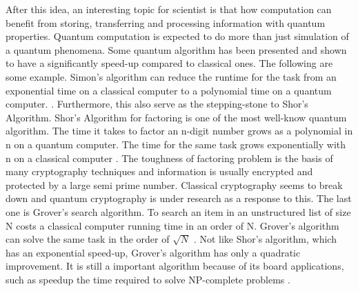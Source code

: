 \documentclass[twoside,a4paper,article]{combine}
\begin{document}
After this idea, an interesting topic for scientist is that how computation can benefit from storing, transferring and processing information with quantum properties. Quantum computation is expected to do more than just simulation of a quantum phenomena. Some quantum algorithm has been presented and shown to have a significantly speed-up compared to classical ones. The following are some example. Simon's algorithm can reduce the runtime for the task from an exponential time on a classical computer to a polynomial time on a quantum computer. \cite{Simon1994}. Furthermore, this also serve as the stepping-stone to Shor's Algorithm. Shor's Algorithm for factoring is one of the most well-know quantum algorithm. The time it takes to factor an n-digit number grows as a polynomial in n on a quantum computer. The time for the same task grows exponentially with n on a classical computer \cite{Shor1995}. The toughness of factoring problem is the basis of many cryptography techniques and information is usually encrypted and protected by a large semi prime number. Classical cryptography seems to break down and  quantum cryptography is under research as a response to this. The last one is Grover's search algorithm. To search an item in an unstructured list of size N costs a classical computer running time in an order of N. Grover's algorithm can solve the same task in the order of $\sqrt{N}$ \cite{Grover1996}. Not like Shor's algorithm, which has an exponential speed-up, Grover's algorithm has only a quadratic improvement. It is still a important algorithm because of its board applications, such as speedup the time required to solve NP-complete problems \cite{Cerf2000} \cite{Bennett1997}. \\
\end{document}
